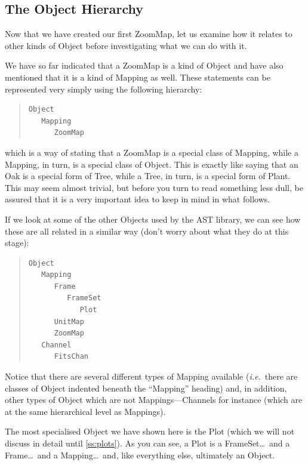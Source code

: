 \documentclass[twoside,11pt]{article}
\newcommand{\htmlref}[2]{#1}
\newcommand{\secref}[1]{\S\ref{#1}}
\renewcommand{\secref}[1]{\ref{#1}}
\begin{document}
\subsection{\label{ss:objecthierarchy}The Object Hierarchy}

Now that we have created our first \htmlref{ZoomMap}{ZoomMap}, let us examine how it
relates to other kinds of \htmlref{Object}{Object} before investigating what we can do
with it.

We have so far indicated that a ZoomMap is a kind of Object and have
also mentioned that it is a kind of \htmlref{Mapping}{Mapping} as well. These statements
can be represented very simply using the following hierarchy:

\begin{quote}
\small
\begin{verbatim}
Object
   Mapping
      ZoomMap
\end{verbatim}
\normalsize
\end{quote}

which is a way of stating that a ZoomMap is a special class of
Mapping, while a Mapping, in turn, is a special class of Object.  This
is exactly like saying that an Oak is a special form of Tree, while a
Tree, in turn, is a special form of Plant. This may seem almost
trivial, but before you turn to read something less dull, be assured
that it is a very important idea to keep in mind in what follows.

If we look at some of the other Objects used by the AST library, we
can see how these are all related in a similar way (don't worry about
what they do at this stage):
\label{ss:mappinghierarchy}

\begin{quote}
\small
\begin{verbatim}
Object
   Mapping
      Frame
         FrameSet
            Plot
      UnitMap
      ZoomMap
   Channel
      FitsChan
\end{verbatim}
\normalsize
\end{quote}

Notice that there are several different types of Mapping available
({\em{i.e.}}\ there are classes of Object indented beneath the
``Mapping'' heading) and, in addition, other types of Object which are
not Mappings---Channels for instance (which are at the same
hierarchical level as Mappings).

The most specialised Object we have shown here is the \htmlref{Plot}{Plot} (which we
will not discuss in detail until \secref{ss:plots}). As you can see, a
Plot is a \htmlref{FrameSet}{FrameSet}\ldots\ and a \htmlref{Frame}{Frame}\ldots\ and a Mapping\ldots\ and,
like everything else, ultimately an Object.
\end{document}
